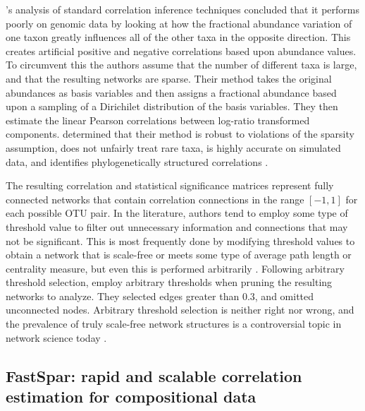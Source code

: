 \citeauthor{Friedman2012}'s analysis of standard correlation inference techniques concluded that it performs poorly on genomic data by looking at how the fractional abundance variation of one taxon greatly influences all of the other taxa in the opposite direction. This creates artificial positive and negative correlations based upon abundance values. To circumvent this the authors assume that the number of different taxa is large, and that the resulting networks are sparse. Their method takes the original abundances as basis variables and then assigns a fractional abundance based upon a sampling of a Dirichilet distribution of the basis variables. They then estimate the linear Pearson correlations between log-ratio transformed components. \citeauthor{Friedman2012} determined that their method is robust to violations of the sparsity assumption, does not unfairly treat rare taxa, is highly accurate on simulated data, and identifies phylogenetically structured correlations \citep{Friedman2012}.

The resulting correlation and statistical significance matrices represent fully connected networks that contain correlation connections in the range $[-1,1]$ for each possible \acrshort{OTU} pair. In the literature, authors tend to employ some type of threshold value to filter out unnecessary information and connections that may not be significant. This is most frequently done by modifying threshold values to obtain a network that is scale-free or meets some type of average path length or centrality measure, but even this is performed arbitrarily \citep{Perkins2009, Batushansky2016, Romero-Campero2016}. Following arbitrary threshold selection, \citeauthor{Friedman2012}  employ arbitrary thresholds when pruning the resulting networks to analyze. They selected edges greater than 0.3, and omitted unconnected nodes. Arbitrary threshold selection is neither right nor wrong, and the prevalence of truly scale-free network structures is a controversial topic in network science today \citep{Broido2019, Barabasi2018, Holme2019}. 

\subsection{FastSpar: rapid and scalable correlation estimation for compositional data} \label{lit-fastspar}

